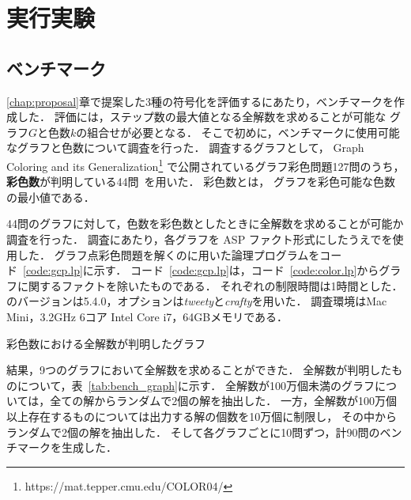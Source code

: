 \chapter{実行実験} \label{chap:experiment}

\section{ベンチマーク}
\ref{chap:proposal}章で提案した3種の符号化を評価するにあたり，ベンチマークを作成した．
評価には，ステップ数の最大値となる全解数を求めることが可能な
グラフ$G$と色数$k$の組合せが必要となる．
そこで初めに，ベンチマークに使用可能なグラフと色数について調査を行った．
調査するグラフとして，
Graph Coloring and its Generalization\footnote{https://mat.tepper.cmu.edu/COLOR04/}
で公開されているグラフ彩色問題127問のうち，
\textbf{彩色数}が判明している44問~\cite{DBLP:journals/constraints/TamuraTKB09}を用いた．
彩色数とは， グラフを彩色可能な色数の最小値である．

44問のグラフに対して，色数を彩色数としたときに全解数を求めることが可能か調査を行った．
調査にあたり，各グラフを ASP ファクト形式にしたうえで{\clingo}を使用した．
グラフ点彩色問題を解くのに用いた論理プログラムをコード~\ref{code:gcp.lp}に示す．
コード~\ref{code:gcp.lp}は，コード~\ref{code:color.lp}からグラフに関するファクトを除いたものである．
それぞれの制限時間は1時間とした．
{\clingo}のバージョンは5.4.0，オプションは\textsl{tweety}と\textsl{crafty}を用いた．
調査環境はMac Mini，3.2GHz 6コア Intel Core i7，64GBメモリである．



\begin{table}[tb]
  \centering
  \caption{彩色数における全解数が判明したグラフ}
  
  \label{tab:bench_graph}
\end{table}

結果，9つのグラフにおいて全解数を求めることができた．
全解数が判明したものについて，表~\ref{tab:bench_graph}に示す．
全解数が100万個未満のグラフについては，全ての解からランダムで2個の解を抽出した．
一方，全解数が100万個以上存在するものについては出力する解の個数を10万個に制限し，
その中からランダムで2個の解を抽出した．
そして各グラフごとに10問ずつ，計90問のベンチマークを生成した．

